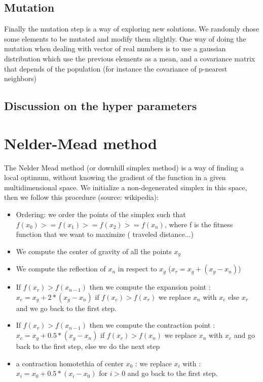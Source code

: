 \subsection{Mutation}
    Finally the mutation step is a way of exploring new solutions. We randomly chose some elements to be mutated and modify them slightly. One way of doing the mutation when dealing with vector of real numbers is to use a gaussian distribution which use the previous elements as a mean, and a covariance matrix that depends of the population (for instance the covariance of p-nearest neighbors)

\subsection{Discussion on the hyper parameters}


\section{Nelder-Mead method}

The Nelder Mead method (or downhill simplex method) is a way of finding a local optimum, without knowing the gradient of the function in a given multidimensional space. We initialize a non-degenerated simplex in this space, then we follow this procedure (source: wikipedia):
\begin{itemize}
    \item Ordering: we order the points of the simplex such that $f(x_0) >= f(x_1) >= f(x_2) \dot >= f(x_n)$, where f is the fitness function that we want to maximize ( traveled distance...)
    \item We compute the center of gravity of all the points $x_g$

    \item We compute the reflection of $x_n$ in respect to $x_g$ ($x_r = x_g + (x_g - x_n )$)

    \item If $f(x_r) > f(x_{n - 1})$ then we compute the expansion point : $x_e = x_g + 2 * (x_g - x_n )$ if $f(x_e) > f(x_r)$ we replace $x_n$ with $x_e$ else $x_r$ and we go back to the first step.

    \item If $f(x_r) > f(x_{n - 1})$ then we compute the contraction point : $x_c = x_g + 0.5 * (x_g - x_n )$ if $f(x_c) > f(x_n)$ we replace $x_n$ with $x_c$ and go back to the first step, else we do the next step

    \item a contraction homotethia of center $x_0$ : we replace $x_i$ with : $x_i = x_0 + 0.5 * (x_i - x_0 )$ for $i > 0$ and go back to the first step.
\end{itemize}
 
